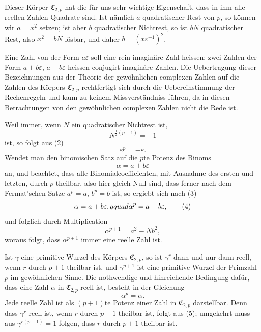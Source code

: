 \documentclass[11pt]{article}
\providecommand{\Cfield}{\mathfrak C}
\begin{document}
Dieser Körper $\Cfield_{2,p}$ hat die für uns sehr wichtige Eigenschaft, dass in ihm alle reellen Zahlen Quadrate sind. Ist nämlich $a$ quadratischer Rest von $p$, so können wir $a=x^2$ setzen; ist aber $b$ quadratischer Nichtrest, so ist $bN$ quadratischer Rest, also $x^2=bN$ lösbar, und daher $b=(x\varepsilon^{-1})^2$.

Eine Zahl von der Form $a\varepsilon$ soll eine rein imaginäre Zahl heissen; zwei Zahlen der Form $a+b\varepsilon$, $a-b\varepsilon$ heissen conjugirt imaginäre Zahlen. Die Uebertragung dieser Bezeichnungen aus der Theorie der gewöhnlichen complexen Zahlen auf die Zahlen des Körpers $\Cfield_{2,p}$ rechtfertigt sich durch die Uebereinstimmung der Rechenregeln und kann zu keinem Missverständniss führen, da in diesen Betrachtungen von den gewöhnlichen complexen Zahlen nicht die Rede ist.

Weil immer, wenn $N$ ein quadratischer Nichtrest ist,
\[
 N^{\frac12(p-1)}=-1
\]
ist, so folgt aus (2)
\begin{equation}
 \varepsilon^p=-\varepsilon .
 \tag{3}
\end{equation}
Wendet man den binomischen Satz auf die $p$te Potenz des Binoms
\[
 \alpha=a+b\varepsilon
\]
an, und beachtet, dass alle Binomialcoefficienten, mit Ausnahme des ersten und letzten, durch $p$ theilbar, also hier gleich Null sind, dass ferner nach dem Fermat'schen Satze $a^p=a$, $b^p=b$ ist, so ergiebt sich nach (3)
\begin{equation}
 \alpha=a+b\varepsilon,\\qquad \alpha^p=a-b\varepsilon,
 \tag{4}
\end{equation}
und folglich durch Multiplication
\begin{equation}
 \alpha^{p+1}=a^2-Nb^2,
 \tag{5}
\end{equation}
woraus folgt, dass $\alpha^{p+1}$ immer eine reelle Zahl ist.

Ist $\gamma$ eine primitive Wurzel des Körpers $\Cfield_{2,p}$, so ist $\gamma^r$ dann und nur dann reell, wenn $r$ durch $p+1$ theilbar ist, und $\gamma^{p+1}$ ist eine primitive Wurzel der Primzahl $p$ im gewöhnlichen Sinne. Die nothwendige und hinreichende Bedingung dafür, dass eine Zahl $\alpha$ in $\Cfield_{2,p}$ reell ist, besteht in der Gleichung
\[
 \alpha^p=\alpha .
\]
Jede reelle Zahl ist als $(p+1)$te Potenz einer Zahl in $\Cfield_{2,p}$ darstellbar. Denn dass $\gamma^r$ reell ist, wenn $r$ durch $p+1$ theilbar ist, folgt aus (5); umgekehrt muss aus $\gamma^{r(p-1)}=1$ folgen, dass $r$ durch $p+1$ theilbar ist.
\end{document}

